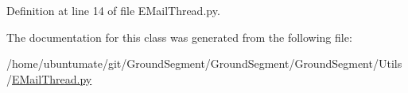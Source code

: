 Definition at line 14 of file E\+Mail\+Thread.\+py.



The documentation for this class was generated from the following file\+:\begin{DoxyCompactItemize}
\item 
/home/ubuntumate/git/\+Ground\+Segment/\+Ground\+Segment/\+Ground\+Segment/\+Utils/\hyperlink{_e_mail_thread_8py}{E\+Mail\+Thread.\+py}\end{DoxyCompactItemize}
